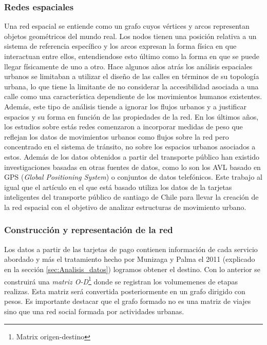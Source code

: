 \documentclass[12pt]{article}
\begin{document}
	\subsubsection{Redes espaciales} 
	
	Una red espacial se entiende como un grafo cuyos vértices y arcos representan objetos geométricos del mundo real. Los nodos tienen una posición relativa a un sistema de referencia específico y los arcos expresan la forma física en que interactuan entre ellos, entendiendose esto último como la forma en que se puede llegar físicamente de uno a otro.
	Hace algunos años atrás los análisis espaciales urbanos se limitaban a utilizar el diseño de las calles en términos de su topología urbana, lo que tiene la limitante de no considerar la accesibilidad asociada a una calle como una característica dependiente de los movimientos humanos existentes. Además, este tipo de análisis tiende a ignorar los flujos urbanos y a justificar espacios y su forma en función de las propiedades de la red.
	En los últimos años, los estudios sobre estás redes comenzaron a incorporar medidas de peso que reflejan los datos de movimientos urbanos como flujos sobre la red pero concentrado en el sistema de tránsito, no sobre los espacios urbanos asociados a estos. 
	Además de los datos obtenidos a partir del transporte público han existido investigaciones basadas en otras fuentes de datos, como lo son los AVL basado en GPS (\textit{Global Positioning System}) o conjuntos de datos telefónicos.
	Este trabajo al igual que el artículo en el que está basado utiliza los datos de la tarjetas inteligentes del transporte público de santiago de Chile para llevar la creación de la red espacial con el objetivo de analizar estructuras de movimiento urbano.
	
    
    
    \subsubsection{Construcción y representación de la red} 
	
	Los datos a partir de las tarjetas de pago contienen información de cada servicio abordado y más el tratamiento hecho por Munizaga y Palma el 2011 \cite{Procesamiento_datos} (explicado en la sección \ref{sec:Analisis_datos}) logramos obtener el destino. Con lo anterior se construirá una \textit{matriz O-D}\footnote{Matrix origen-destino} donde se registran los volumemenes de etapas realizas. Esta matriz será convertida posteriormente en un grafo dirigido con pesos. Es importante destacar que el grafo formado no es una matriz de viajes sino que una red social formada por actividades urbanas.
	
\end{document}
